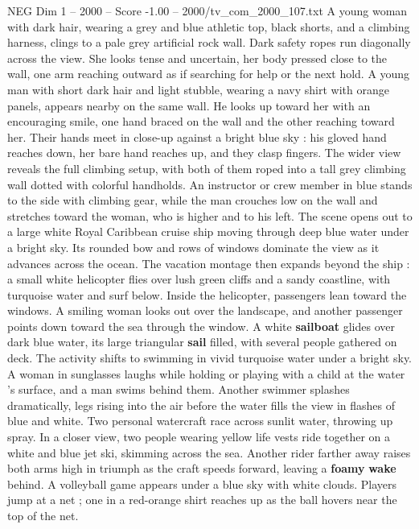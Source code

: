 \begin{textsample}{NEG Dim 1 – 2000 – Score -1.00 – 2000/tv\_com\_2000\_107.txt}  \label{ex:f1_neg_064}
A young woman with dark hair, wearing a grey and blue athletic top, black shorts, and a climbing harness, clings to a pale grey artificial rock wall.
Dark safety ropes run diagonally across the view.
She looks tense and uncertain, her body pressed close to the wall, one arm reaching outward as if searching for help or the next hold.
A young man with short dark hair and light stubble, wearing a navy shirt with orange panels, appears nearby on the same wall.
He looks up toward her with an encouraging smile, one hand braced on the wall and the other reaching toward her.
Their hands meet in close-up against a bright blue sky : his gloved hand reaches down, her bare hand reaches up, and they clasp fingers.
The wider view reveals the full climbing setup, with both of them roped into a tall grey climbing wall dotted with colorful handholds.
An instructor or crew member in blue stands to the side with climbing gear, while the man crouches low on the wall and stretches toward the woman, who is higher and to his left.
The scene opens out to a large white Royal Caribbean cruise ship moving through deep blue water under a bright sky.
Its rounded bow and rows of windows dominate the view as it advances across the ocean.
The vacation montage then expands beyond the ship : a small white helicopter flies over lush green cliffs and a sandy coastline, with turquoise water and surf below.
Inside the helicopter, passengers lean toward the windows.
A smiling woman looks out over the landscape, and another passenger points down toward the sea through the window.
A white \textbf{sailboat} glides over dark blue water, its large triangular \textbf{sail} filled, with several people gathered on deck.
The activity shifts to swimming in vivid turquoise water under a bright sky.
A woman in sunglasses laughs while holding or playing with a child at the water ’s surface, and a man swims behind them.
Another swimmer splashes dramatically, legs rising into the air before the water fills the view in flashes of blue and white.
Two personal watercraft race across sunlit water, throwing up spray.
In a closer view, two people wearing yellow life vests ride together on a white and blue jet ski, skimming across the sea.
Another rider farther away raises both arms high in triumph as the craft speeds forward, leaving a \textbf{foamy} \textbf{wake} behind.
A volleyball game appears under a blue sky with white clouds.
Players jump at a net ; one in a red-orange shirt reaches up as the ball hovers near the top of the net.

\end{textsample}
